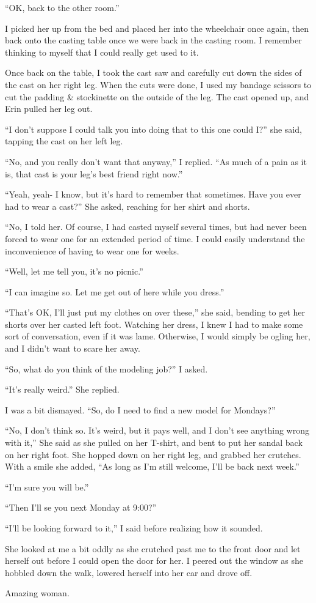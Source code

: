 ``OK, back to the other room.''

I picked her up from the bed and placed her into the wheelchair once again, then back onto
the casting table once we were back in the casting room. I remember thinking to myself that I
could really get used to it.

Once back on the table, I took the cast saw and carefully cut down the sides of the cast on
her right leg. When the cuts were done, I used my bandage scissors to cut the padding \&
stockinette on the outside of the leg. The cast opened up, and Erin pulled her leg out.

``I don't suppose I could talk you into doing that to this one could I?'' she said, tapping
the cast on her left leg.

``No, and you really don't want that anyway,'' I replied. ``As much of a pain as it is, that
cast is your leg's best friend right now.''

``Yeah, yeah- I know, but it's hard to remember that sometimes. Have you ever had to wear a
cast?'' She asked, reaching for her shirt and shorts.

``No, I told her. Of course, I had casted myself several times, but had never been forced to
wear one for an extended period of time. I could easily understand the inconvenience of having
to wear one for weeks.

``Well, let me tell you, it's no picnic.''

``I can imagine so. Let me get out of here while you dress.''

``That's OK, I'll just put my clothes on over these,'' she said, bending to get her shorts
over her casted left foot. Watching her dress, I knew I had to make some sort of conversation,
even if it was lame. Otherwise, I would simply be ogling her, and I didn't want to scare her
away.

``So, what do you think of the modeling job?'' I asked.

``It's really weird.'' She replied.

I was a bit dismayed. ``So, do I need to find a new model for Mondays?''

``No, I don't think so. It's weird, but it pays well, and I don't see anything wrong with
it,'' She said as she pulled on her T-shirt, and bent to put her sandal back on her right foot.
She hopped down on her right leg, and grabbed her crutches. With a smile she added, ``As long as
I'm still welcome, I'll be back next week.''

``I'm sure you will be.''

``Then I'll se you next Monday at 9:00?''

``I'll be looking forward to it,'' I said before realizing how it sounded.

She looked at me a bit oddly as she crutched past me to the front door and let herself out
before I could open the door for her. I peered out the window as she hobbled down the walk,
lowered herself into her car and drove off.

Amazing woman.
